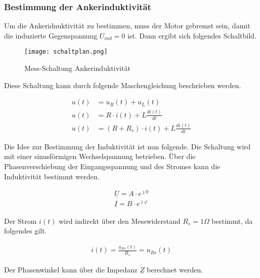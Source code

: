 \subsubsection{Bestimmung der Ankerinduktivität}

Um die Ankeridnuktivität zu bestimmen, muss der Motor gebremst sein,
damit die induzierte Gegenspannung $U_{ind} = 0$ ist. Dann ergibt sich
folgendes Schaltbild.


\begin{figure}[H]
    \centering
    \texttt{[image: schaltplan.png]}
    \caption{Mess-Schaltung Ankerinduktivität}
    \label{fig:PlotAufgabe1}
   \end{figure}

Diese Schaltung kann durch folgende Maschengleichung beschrieben werden.

\begin{equation} \label{eq211}
    \begin{split}
        u(t)&=u_R(t) + u_L(t)\\
        u(t)&=R \cdot i(t) + L \frac{d i(t)}{dt}\\
        u(t)&= (R+R_s) \cdot i(t) + L \frac{d i(t)}{dt}
    \end{split}
\end{equation}

Die Idee zur Bestimmung der Induktivität ist nun folgende. Die Schaltung
wird mit einer sinusförmigen Wechselspannung betrieben. Über die
Phasenverschiebung der Eingangsspannung und des Stromes kann die Induktivität
bestimmt werden.

\begin{equation} \label{eq212}
    \begin{split}
        \underline{U} = A \cdot e^{\jmath 0}\\
        \underline{I} = B \cdot e^{\jmath \varphi}
    \end{split}
\end{equation}

Der Strom $i(t)$ wird indirekt über den Messwiderstand $R_s= 1\Omega$
bestimmt, da folgendes gilt.

\begin{equation} \label{eq213}
    \begin{split}
        i(t)=\frac{u_{Rs}(t)}{R_s} = u_{Rs}(t)
    \end{split}
\end{equation}

Der Phasenwinkel kann über die Impedanz $\underline{Z}$ berechnet werden.

